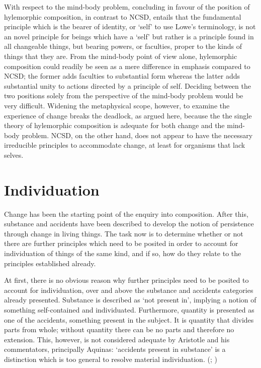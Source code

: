 With respect to the mind-body problem, concluding in favour of the position of hylemorphic composition, in contrast to NCSD, entails that the fundamental principle which is the bearer of identity, or `self' to use Lowe's terminology, is not an novel principle for beings which have a `self' but rather is a principle found in all changeable things, but bearing powers, or faculties, proper to the kinds of things that they are. From the mind-body point of view alone, hylemorphic composition could readily be seen as a mere difference in emphasis compared to NCSD; the former adds faculties to substantial form whereas the latter adds substantial unity to actions directed by a principle of self. Deciding between the two positions solely from the perspective of the mind-body problem would be very difficult. Widening the metaphysical scope, however, to examine the experience of change breaks the deadlock, as argued here, because the the single theory of hylemorphic composition is adequate for both change and the mind-body problem. NCSD, on the other hand, does not appear to have the necessary irreducible principles to accommodate change, at least for organisms that lack selves.


\section{Individuation}

Change has been the starting point of the enquiry into composition. After this, substance and accidents have been described to develop the notion of persistence through change in living things. The task now is to determine whether or not there are further principles which need to be posited in order to account for individuation of things of the same kind, and if so, how do they relate to the principles established already.

At first, there is no obvious reason why further principles need to be posited to account for individuation, over and above the substance and accidents categories already presented. Substance is described as `not present in', implying a notion of something self-contained and individuated. Furthermore, quantity is presented as one of the accidents, something present in the subject. It is quantity that divides parts from whole; without quantity there can be no parts and therefore no extension. This, however, is not considered adequate by Aristotle and his commentators, principally Aquinas: `accidents present in substance' is a distinction which is too general to resolve material individuation. (\cite[][103]{dominguez1991metaphysics}; \cite[][11]{klima-aquinas-contemporary})

